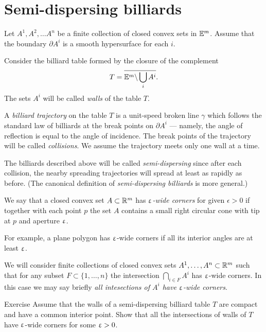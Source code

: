 \section{Semi-dispersing billiards}

Let $A^1,A^2,\dots A^n$ be a finite collection of closed convex sets in $\mathbb{E}^m$.
Assume that the boundary $\partial A^i$ is a smooth hypersurface for each $i$.

Consider the billiard table formed by the closure of the complement 
$$T=\overline{\mathbb{E}^m\backslash \bigcup_{i} A^i}.$$
The sets $A^i$ will be called \emph{walls} of the table $T$.

A \emph{billiard trajectory} 
on the table $T$ is a unit-speed broken line $\gamma$
which follows  the
standard law of billiards 
at the break points on $\partial A^i$ 
--- namely, the angle of reflection is equal to the angle of incidence.
The break points of the trajectory will be called \emph{collisions}.
We assume the trajectory meets only one wall at a time.

The billiards described above will be called \emph{semi-dispersing} since after each collision, the nearby spreading trajectories will spread at least as rapidly as before.
(The canonical definition of  \emph{semi-dispersing billiards} is more general.)

We say that a closed convex set $A\subset \RR^m$ has  \emph{$\upvarepsilon$-wide corners} for given $\epsilon >0$ 
if together with each point $p$
the set $A$ contains a small right circular cone
with tip at $p$ and aperture 
$\upvarepsilon$.

For example, 
a plane polygon 
has $\upvarepsilon$-wide corners
if all its interior angles are at least $\upvarepsilon$.

We will consider finite collections of closed convex sets 
$A^1,\dots,A^n\subset\RR^m$ 
such that for any subset $F\subset\{1,\dots,n\}$
the intersection
$\bigcap_{i\in F}A^i$ 
has $\upvarepsilon$-wide corners.
In this case we may say briefly \emph{all intesections of $A^i$ have $\upvarepsilon$-wide corners}.

\begin{thm}{Exercise}
Assume that the walls
of a semi-dispersing billiard table $T$ 
are compact and have a common  interior point.
Show that all the intersections of  walls of $T$ have $\upvarepsilon$-wide corners for some $\upvarepsilon>0$.
\end{thm}

